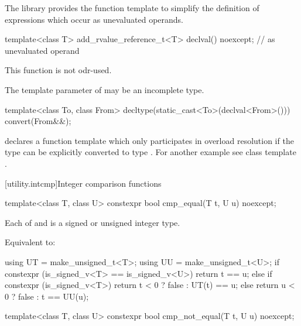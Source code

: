 \pnum
The library provides the function template  to simplify the definition of
expressions which occur as unevaluated operands.

%
\begin{itemdecl}
template<class T> add_rvalue_reference_t<T> declval() noexcept;    // as unevaluated operand
\end{itemdecl}

\begin{itemdescr}
\pnum
\mandates
This function is not odr-used.

\pnum
\remarks
The template parameter  of  may be an incomplete type.

\pnum
\begin{example}
\begin{codeblock}
template<class To, class From> decltype(static_cast<To>(declval<From>())) convert(From&&);
\end{codeblock}
declares a function template  which only participates in overload resolution if the
type  can be explicitly converted to type . For another example see class
template .
\end{example}
\end{itemdescr}

[utility.intcmp]{Integer comparison functions}

%
\begin{itemdecl}
template<class T, class U>
  constexpr bool cmp_equal(T t, U u) noexcept;
\end{itemdecl}

\begin{itemdescr}
\pnum
\mandates
Each of  and  is
a signed or unsigned integer type.

\pnum
\effects
Equivalent to:
\begin{codeblock}
using UT = make_unsigned_t<T>;
using UU = make_unsigned_t<U>;
if constexpr (is_signed_v<T> == is_signed_v<U>)
  return t == u;
else if constexpr (is_signed_v<T>)
  return t < 0 ? false : UT(t) == u;
else
  return u < 0 ? false : t == UU(u);
\end{codeblock}
\end{itemdescr}

%
\begin{itemdecl}
template<class T, class U>
  constexpr bool cmp_not_equal(T t, U u) noexcept;
\end{itemdecl}

